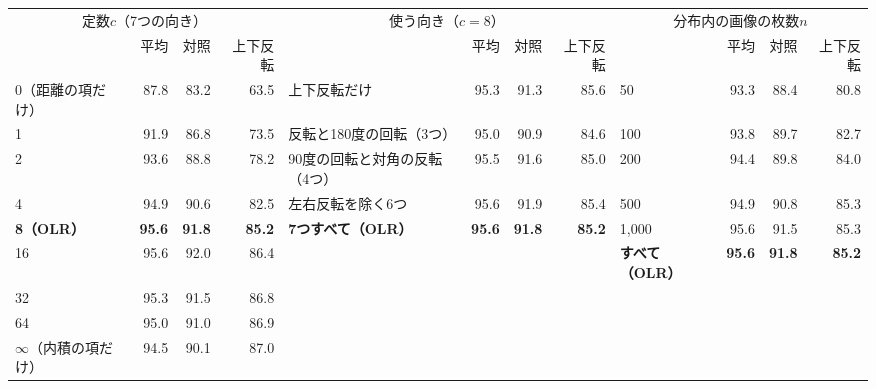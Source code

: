 \documentclass[border=3pt]{standalone}
\newcommand{\B}[1]{\textcolor{tnavy}{\textbf{#1}}}
\begin{document}
%
\begin{tabular}{lrrr@{\hspace{18pt}}lrrr@{\hspace{18pt}}lrrr}%
\toprule
\multicolumn{4}{c}{定数$c$（7つの向き）} & \multicolumn{4}{c}{使う向き（$c=8$）} & \multicolumn{4}{c}{分布内の画像の枚数$n$}\\
\cmidrule(lr){1-4}\cmidrule(lr){5-8}\cmidrule(lr){9-12}
 & 平均 & 対照 & 上下反転 & & 平均 & 対照 & 上下反転 & & 平均 & 対照 & 上下反転\\
\midrule
0（距離の項だけ） & 87.8 & 83.2 & 63.5 & 上下反転だけ & 95.3 & 91.3 & 85.6 & 50 & 93.3 & 88.4 & 80.8\\
1 & 91.9 & 86.8 & 73.5 & 反転と180度の回転（3つ） & 95.0 & 90.9 & 84.6 & 100 & 93.8 & 89.7 & 82.7\\
2 & 93.6 & 88.8 & 78.2 & 90度の回転と対角の反転（4つ） & 95.5 & 91.6 & 85.0 & 200 & 94.4 & 89.8 & 84.0\\
4 & 94.9 & 90.6 & 82.5 & 左右反転を除く6つ & 95.6 & 91.9 & 85.4 & 500 & 94.9 & 90.8 & 85.3\\
\B{8（OLR）} & \B{95.6} & \B{91.8} & \B{85.2} & \B{7つすべて（OLR）} & \B{95.6} & \B{91.8} & \B{85.2} & 1{,}000 & 95.6 & 91.5 & 85.3\\
16 & 95.6 & 92.0 & 86.4 &  &  &  &  & \B{すべて（OLR）} & \B{95.6} & \B{91.8} & \B{85.2}\\
32 & 95.3 & 91.5 & 86.8 &  &  &  &  &  &  &  & \\
64 & 95.0 & 91.0 & 86.9 &  &  &  &  &  &  &  & \\
$\infty$（内積の項だけ） & 94.5 & 90.1 & 87.0 &  &  &  &  &  &  &  & \\
\bottomrule
\end{tabular}%
\end{document}
